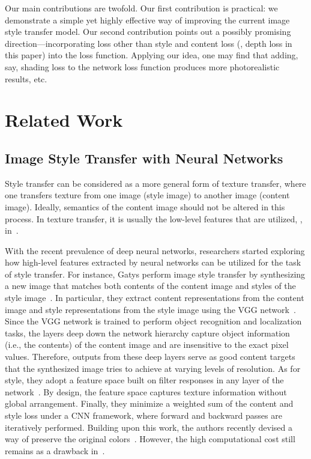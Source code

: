 \documentclass[10pt,twocolumn,letterpaper]{article}
\begin{document}
Our main contributions are twofold. Our first contribution is practical: we demonstrate a simple yet highly effective way of improving the current image style transfer model. Our second contribution points out a possibly promising direction---incorporating loss other than style and content loss (\ie, depth loss in this paper) into the loss function. Applying our idea, one may find that adding, say, shading loss to the network loss function produces more photorealistic results, etc.

\section{Related Work}


\subsection{Image Style Transfer with Neural Networks}

Style transfer can be considered as a more general form of texture transfer, where one transfers texture from one image (style image) to another image (content image). Ideally, semantics of the content image should not be altered in this process. In texture transfer, it is usually the low-level features that are utilized, \eg, in~\cite{efros2001image}.

With the recent prevalence of deep neural networks, researchers started exploring how high-level features extracted by neural networks can be utilized for the task of style transfer. For instance, Gatys \etal perform image style transfer by synthesizing a new image that matches both contents of the content image and styles of the style image~\cite{gatys2016image}. In particular, they extract content representations from the content image and style representations from the style image using the VGG network~\cite{simonyan2014very}. Since the VGG network is trained to perform object recognition and localization tasks, the layers deep down the network hierarchy capture object information (i.e., the contents) of the content image and are insensitive to the exact pixel values. Therefore, outputs from these deep layers serve as good content targets that the synthesized image tries to achieve at varying levels of resolution. As for style, they adopt a feature space built on filter responses in any layer of the network~\cite{gatys2015texture}. By design, the feature space captures texture information without global arrangement. Finally, they minimize a weighted sum of the content and style loss under a CNN framework, where forward and backward passes are iteratively performed. Building upon this work, the authors recently devised a way of preserve the original colors~\cite{gatys2016preserving}. However, the high computational cost still remains as a drawback in~\cite{gatys2016image}.
\end{document}
